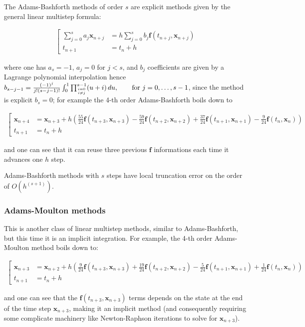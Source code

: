 \documentclass{digitaldynamics}
\def\vect#1{\bm{#1}}
\begin{document}
The Adams-Bashforth methods of order $s$ are explicit methods given by the general linear multistep formula:
\begin{fleqn}
\begin{align}
\left[
\begin{aligned}
\sum_{j=0}^s a_j \vect{x}_{n+j} &= h\sum_{j=0}^s b_j \vect{f}(t_{n+j},\vect{x}_{n+j}) \\
t_{n+1} &= t_n + h 
\end{aligned}
\right.
\end{align}
\end{fleqn}
where one has $a_s=-1$, $a_j=0$ for $j<s$, and $b_j$ coefficients are given by a Lagrange polynomial interpolation hence $b_{s-j-1} = \frac{(-1)^j}{j!(s-j-1)!} \int_0^1 \prod_{i=0 \atop i\ne j}^{s-1} (u+i) \,du, \qquad \text{for } j=0,\ldots,s-1$, since the method is explicit $b_s=0$; for example the 4-th order Adams-Bashforth boils down to 
\begin{fleqn}
\begin{align}
\left[
\begin{aligned}
\vect{x}_{n+4} &= \vect{x}_{n+3} + h\left( \frac{55}{24} \vect{f}(t_{n+3}, \vect{x}_{n+3}) - \frac{59}{24} \vect{f}(t_{n+2}, \vect{x}_{n+2}) + \frac{37}{24} \vect{f}(t_{n+1}, \vect{x}_{n+1}) - \frac{9}{24} \vect{f}(t_n, \vect{x}_n) \right) \\
t_{n+1} &= t_n + h 
\end{aligned}
\right.
\end{align}
\end{fleqn}
and one can see that it can reuse three previous $\vect{f}$ informations each time it advances one $h$ step.

Adams-Bashforth methods with $s$ steps have local truncation error on the order of $O ( h^{(s+1)} )$.






\subsubsection{Adams-Moulton methods}

This is another class of linear multistep methods, similar to Adams-Bashforth, but this time it is an implicit integration.
For example, the 4-th order Adams-Moulton method boils down to:
\begin{fleqn}
\begin{align}
\left[
\begin{aligned}
\vect{x}_{n+3} &= \vect{x}_{n+2} + h \left( \frac{9}{24} \vect{f}(t_{n+3},\vect{x}_{n+3}) + \frac{19}{24} \vect{f}(t_{n+2},\vect{x}_{n+2}) - \frac{5}{24} \vect{f}(t_{n+1},\vect{x}_{n+1}) + \frac{1}{24} \vect{f}(t_n,\vect{x}_n) \right) \\
t_{n+1} &= t_n + h 
\end{aligned}
\right.
\end{align}
\end{fleqn}
and one can see that the $\vect{f}(t_{n+3},\vect{x}_{n+3})$ terms depends on the state at the end of the time step $\vect{x}_{n+3}$, making it an implicit method (and consequently requiring some complicate machinery like Newton-Raphson iterations to solve for $\vect{x}_{n+3}$).
\end{document}
